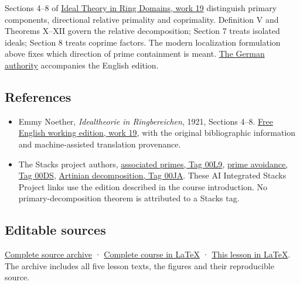 \documentclass[
]{article}
\providecommand{\tightlist}{%
  \setlength{\itemsep}{0pt}\setlength{\parskip}{0pt}}
\begin{document}
Sections 4--8 of
\href{https://github.com/KokunoYumeto/emmy-noether-en/blob/main/source/Noether_English_ED0014.tex}{Ideal
Theory in Ring Domains, work 19} distinguish primary components,
directional relative primality and coprimality. Definition V and
Theorems X--XII govern the relative decomposition; Section 7 treats
isolated ideals; Section 8 treats coprime factors. The modern
localization formulation above fixes which direction of prime
containment is meant. \href{https://doi.org/10.5281/zenodo.21908301}{The
German authority} accompanies the English edition.

\subsection{References}\label{references}

\begin{itemize}
\tightlist
\item
  Emmy Noether, \emph{Idealtheorie in Ringbereichen}, 1921, Sections
  4--8.
  \href{https://github.com/KokunoYumeto/emmy-noether-en/blob/main/source/Noether_English_ED0014.tex}{Free
  English working edition, work 19}, with the original bibliographic
  information and machine-assisted translation provenance.
\item
  The Stacks project authors,
  \href{https://kokunoyumeto.github.io/stacks-zh-hans-cn/en/algebra.html\#section-ass}{associated
  primes, Tag 00L9},
  \href{https://kokunoyumeto.github.io/stacks-zh-hans-cn/en/algebra.html\#lemma-silly}{prime
  avoidance, Tag 00DS},
  \href{https://kokunoyumeto.github.io/stacks-zh-hans-cn/en/algebra.html\#lemma-product-local}{Artinian
  decomposition, Tag 00JA}. These AI Integrated Stacks Project links use
  the edition described in the course introduction. No
  primary-decomposition theorem is attributed to a Stacks tag.
\end{itemize}

\subsection{Editable sources}\label{editable-sources}

\href{ideal-theory-in-rings-source.zip}{Complete source archive} ·
\href{ideal-theory-in-rings.tex}{Complete course in LaTeX} ·
\href{NOE-IDL-02.tex}{This lesson in LaTeX}. The archive includes all
five lesson texts, the figures and their reproducible source.
\end{document}
